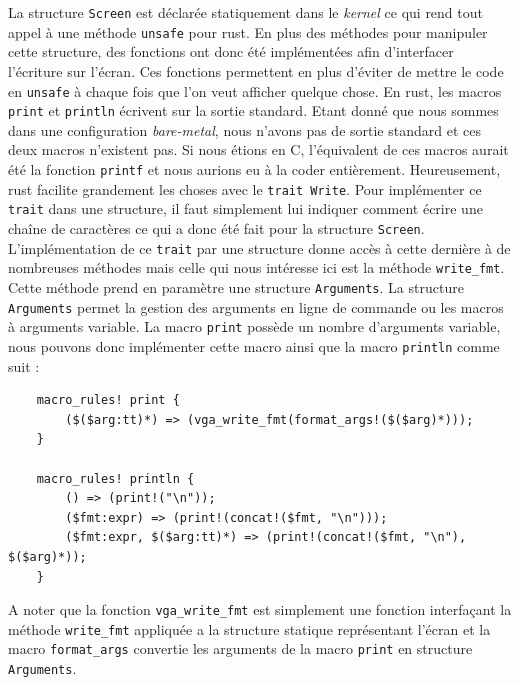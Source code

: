 La structure \texttt{Screen} est déclarée statiquement dans le \textit{kernel}
ce qui rend tout appel à une méthode \texttt{unsafe} pour rust. En plus
des méthodes pour manipuler cette structure, des fonctions ont donc été implémentées
afin d'interfacer l'écriture sur l'écran. Ces fonctions permettent en plus d'éviter
de mettre le code en \texttt{unsafe} à chaque fois que l'on veut afficher
quelque chose. En rust, les macros \texttt{print} et \texttt{println}
écrivent sur la sortie standard. Etant donné que nous sommes dans une configuration
\textit{bare-metal}, nous n'avons pas de sortie standard et ces deux macros n'existent
pas. Si nous étions en C, l'équivalent de ces macros aurait été la fonction
\texttt{printf} et nous aurions eu à la coder entièrement. Heureusement,
rust facilite grandement les choses avec le \texttt{trait Write}.
Pour implémenter ce \texttt{trait} dans une structure, il faut simplement
lui indiquer comment écrire une chaîne de caractères ce qui a donc été fait
pour la structure \texttt{Screen}. L'implémentation de ce \texttt{trait}
par une structure donne accès à cette dernière à de nombreuses méthodes mais celle
qui nous intéresse ici est la méthode \texttt{write_fmt}. Cette méthode
prend en paramètre une structure \texttt{Arguments}. La structure
\texttt{Arguments} permet la gestion des arguments en ligne de commande
ou les macros à arguments variable. La macro \texttt{print} possède
un nombre d'arguments variable, nous pouvons donc implémenter cette macro ainsi
que la macro \texttt{println} comme suit :

\begin{verbatim}
    macro_rules! print {
        ($($arg:tt)*) => (vga_write_fmt(format_args!($($arg)*)));
    }
    
    macro_rules! println {
        () => (print!("\n"));
        ($fmt:expr) => (print!(concat!($fmt, "\n")));
        ($fmt:expr, $($arg:tt)*) => (print!(concat!($fmt, "\n"), $($arg)*));
    }
\end{verbatim}

A noter que la fonction \texttt{vga_write_fmt} est simplement une fonction
interfaçant la méthode \texttt{write_fmt} appliquée a la structure
statique représentant l'écran et la macro \texttt{format_args} convertie
les arguments de la macro \texttt{print} en structure \texttt{Arguments}.

